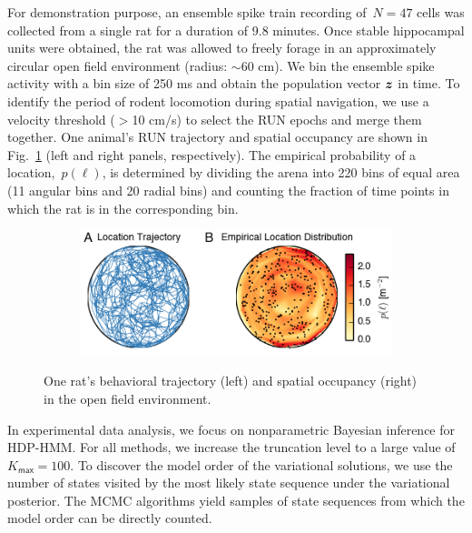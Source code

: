 For demonstration purpose, an ensemble spike train recording
of~${N=47}$ cells was collected from a single rat for a duration of
9.8 minutes.  Once stable hippocampal units were obtained, the rat was
allowed to freely forage in an approximately circular open field
environment (radius: $\sim$60 cm).  We bin the ensemble spike activity
with a bin size of 250 ms and obtain the population vector $\boldsymbol{z}$ in
time.  To identify the period of rodent locomotion during spatial
navigation, we use a velocity threshold ($>$10 cm/s) to select the RUN
epochs and merge them together.  One animal's RUN trajectory and
spatial occupancy are shown in Fig.~\ref{fig4} (left and right panels,
respectively). The empirical probability of a location,~${p(\ell)}$,
is determined by dividing the arena into 220 bins of equal area (11
angular bins and 20 radial bins) and counting the fraction of time
points in which the rat is in the corresponding bin.

\begin{figure}
\centering
\begin{subfigure}[t]{\textwidth}
\centering
\includegraphics[width=4in]{figures/ch5/Fig4}
\end{subfigure}
\caption[Trajectory of the freely foraging rat during hippocampal
  recording]{One rat's behavioral trajectory (left) and spatial
  occupancy (right) in the open field environment. }
\label{fig4}
\end{figure}

In experimental data analysis, we focus on nonparametric Bayesian
inference for HDP-HMM.  For all methods, we increase the truncation
level to a large value of $K_{\mathsf{max}}=100$.  To discover the model order of the
variational solutions, we use the number of states visited by the most
likely state sequence under the variational posterior. The MCMC
algorithms yield samples of state sequences from which the model order
can be directly counted.


